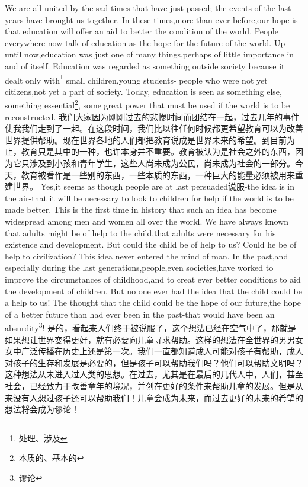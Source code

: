 \documentclass[lang=cn,10pt]{elegantbook}
\begin{document}
We are all united by the sad times that have just passed; the events of the last years have brought us together. In these times,more than ever before,our hope is that education will offer an aid to better the condition of the world. People everywhere now talk of education as the hope for the future of the world. Up until now,education was just one of many things,perhaps of little importance in and of itself. Education was regarded as something outside society because it dealt only with\footnote{处理、涉及} small children,young students- people who were not yet citizens,not yet a part of society. Today, education is seen as something else, something essential\footnote{本质的、基本的}, some great power that must be used if the world is to be reconstructed.
我们大家因为刚刚过去的悲惨时间而团结在一起，过去几年的事件使我我们走到了一起。在这段时间，我们比以往任何时候都更希望教育可以为改善世界提供帮助。现在世界各地的人们都把教育说成是世界未来的希望。到目前为止，教育只是其中的一种，也许本身并不重要。教育被认为是社会之外的东西，因为它只涉及到小孩和青年学生，这些人尚未成为公民，尚未成为社会的一部分。今天，教育被看作是一些别的东西，一些本质的东西，一种巨大的能量必须被用来重建世界。
Yes,it seems as though people are at last persuaded说服-the idea is in the air-that it will be necessary to look to children for help if the world is to be made better. This is the first time in history that such an idea has become widespread among men and women all over the world. We have always known that adults might be of help to the child,that adults were necessary for his existence and development. But could the child be of help to us? Could he be of help to civilization? This idea never entered the mind of man. In the past,and especially during the last generations,people,even societies,have worked to improve the circumstances of childhood,and to creat ever better conditions to aid the development of children. But no one ever had the idea that the child could be a help to us! The thought that the child could be the hope of our future,the hope of a better future than had ever been in the past-that would have been an absurdity\footnote{谬论}!
是的，看起来人们终于被说服了，这个想法已经在空气中了，那就是如果想让世界变得更好，就有必要向儿童寻求帮助。这样的想法在全世界的男男女女中广泛传播在历史上还是第一次。我们一直都知道成人可能对孩子有帮助，成人对孩子的生存和发展是必要的，但是孩子可以帮助我们吗？他们可以帮助文明吗？这种想法从未进入过人类的思想。在过去，尤其是在最后的几代人中，人们，甚至社会，已经致力于改善童年的境况，并创在更好的条件来帮助儿童的发展。但是从来没有人想过孩子还可以帮助我们！儿童会成为未来，而过去更好的未来的希望的想法将会成为谬论！
\end{document}
